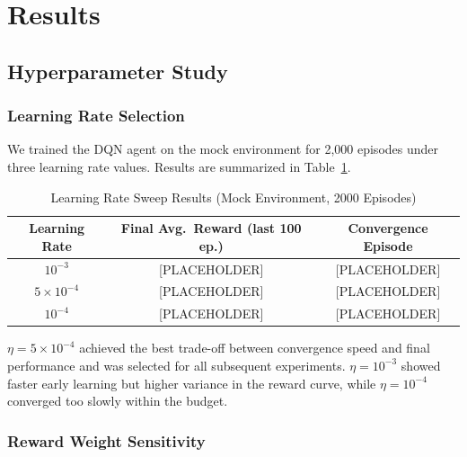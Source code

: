 

\section{Results}

\subsection{Hyperparameter Study}

\subsubsection{Learning Rate Selection}

We trained the DQN agent on the mock environment for 2,000 episodes under
three learning rate values. Results are summarized in Table~\ref{tab:lr_sweep}.

\begin{table}[h]
\centering
\caption{Learning Rate Sweep Results (Mock Environment, 2000 Episodes)}
\begin{tabular}{ccc}
\hline
\textbf{Learning Rate} & \textbf{Final Avg.\ Reward (last 100 ep.)} & \textbf{Convergence Episode} \\
\hline
$10^{-3}$           & [PLACEHOLDER] & [PLACEHOLDER] \\
$5 \times 10^{-4}$  & [PLACEHOLDER] & [PLACEHOLDER] \\
$10^{-4}$           & [PLACEHOLDER] & [PLACEHOLDER] \\
\hline
\end{tabular}
\label{tab:lr_sweep}
\end{table}

$\eta = 5 \times 10^{-4}$ achieved the best trade-off between convergence
speed and final performance and was selected for all subsequent experiments.
$\eta = 10^{-3}$ showed faster early learning but higher variance in the
reward curve, while $\eta = 10^{-4}$ converged too slowly within the budget.

\subsubsection{Reward Weight Sensitivity}

